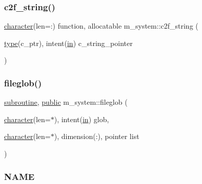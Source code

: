 \mbox{\label{namespacem__system_aa7c5445619aa15cd2301fe17f7c3b73c}} 
\subsubsection{\texorpdfstring{c2f\+\_\+string()}{c2f\_string()}}
{\footnotesize\ttfamily \hyperlink{option__stopwatch_83_8txt_abd4b21fbbd175834027b5224bfe97e66}{character}(len=\+:) function, allocatable m\+\_\+system\+::c2f\+\_\+string (\begin{DoxyParamCaption}\item[{\hyperlink{stop__watch_83_8txt_a70f0ead91c32e25323c03265aa302c1c}{type}(c\+\_\+ptr), intent(\hyperlink{M__journal_83_8txt_afce72651d1eed785a2132bee863b2f38}{in})}]{c\+\_\+string\+\_\+pointer }\end{DoxyParamCaption})\hspace{0.3cm}{\ttfamily [private]}}

\mbox{\label{namespacem__system_a79656f76ad75168302e0d770052e901e}} 
\subsubsection{\texorpdfstring{fileglob()}{fileglob()}}
{\footnotesize\ttfamily \hyperlink{M__stopwatch_83_8txt_acfbcff50169d691ff02d4a123ed70482}{subroutine}, \hyperlink{M__stopwatch_83_8txt_a2f74811300c361e53b430611a7d1769f}{public} m\+\_\+system\+::fileglob (\begin{DoxyParamCaption}\item[{\hyperlink{option__stopwatch_83_8txt_abd4b21fbbd175834027b5224bfe97e66}{character}(len=$\ast$), intent(\hyperlink{M__journal_83_8txt_afce72651d1eed785a2132bee863b2f38}{in})}]{glob,  }\item[{\hyperlink{option__stopwatch_83_8txt_abd4b21fbbd175834027b5224bfe97e66}{character}(len=$\ast$), dimension(\+:), pointer}]{list }\end{DoxyParamCaption})}



\subsubsection*{N\+A\+ME}

